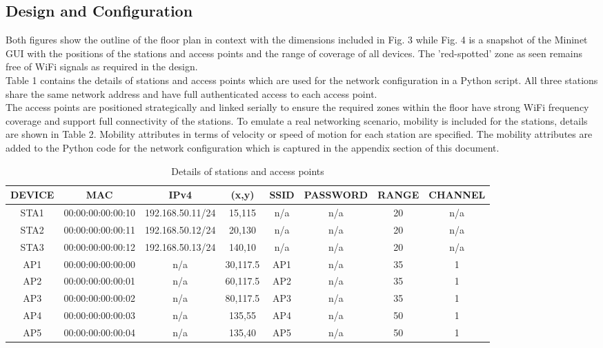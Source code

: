 \documentclass{article}
\begin{document}
\subsection{Design and Configuration}
Both figures show the outline of the floor plan in context with the dimensions included in Fig. 3 while Fig. 4 is a snapshot of the Mininet GUI with the positions of the stations and access points and the range of coverage of all devices. The 'red-spotted' zone as seen remains free of WiFi signals as required in the design. \\ Table 1 contains the details of stations and access points which are used for the network configuration in a Python script. All three stations share the same network address and have full authenticated access to each access point. \\ The access points are positioned strategically and linked serially to ensure the required zones within the floor have strong WiFi frequency coverage and support full connectivity of the stations. To emulate a real networking scenario, mobility is included for the stations, details are shown in Table 2. Mobility attributes in terms of velocity or speed of motion for each station are specified. The mobility attributes are added to the Python code for the network configuration which is captured in the appendix section of this document.
  	\begin{table}[h]
        		\begin{tabular}{|c|c|c|c|c|c|c|c|}
        			\hline
        			DEVICE & MAC & IPv4 & (x,y) & SSID & PASSWORD & RANGE & CHANNEL\\
        			\hline
        			STA1 & 00:00:00:00:00:10 & 192.168.50.11/24 & 15,115 & n/a & n/a & 20 & n/a \\
        			STA2 & 00:00:00:00:00:11 & 192.168.50.12/24 & 20,130 & n/a & n/a & 20 & n/a \\
       			STA3 & 00:00:00:00:00:12 & 192.168.50.13/24 & 140,10 & n/a & n/a & 20 & n/a \\
        			AP1 & 00:00:00:00:00:00 & n/a & 30,117.5 & AP1 & n/a & 35 & 1 \\
        			AP2 & 00:00:00:00:00:01 & n/a & 60,117.5 & AP2 & n/a & 35 & 1 \\
        			AP3 & 00:00:00:00:00:02 & n/a & 80,117.5 & AP3 & n/a & 35 & 1 \\
        			AP4 & 00:00:00:00:00:03 & n/a & 135,55 & AP4 & n/a & 50 & 1 \\
        			AP5 & 00:00:00:00:00:04 & n/a & 135,40 & AP5 & n/a & 50 & 1 \\
        			\hline
        		\end{tabular}
        \caption{Details of stations and access points}
        \label{tab:1}
    	\end{table}
\end{document}
